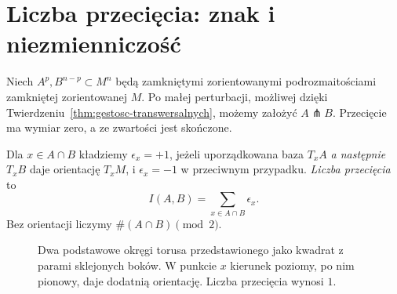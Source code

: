 \section{Liczba przecięcia: znak i niezmienniczość}
\label{sec:przeciecia-16}

Niech $A^p,B^{n-p}\subset M^n$ będą
zamkniętymi zorientowanymi
podrozmaitościami zamkniętej
zorientowanej $M$. Po małej
perturbacji, możliwej dzięki
Twierdzeniu~\ref{thm:gestosc-transwersalnych},
możemy założyć $A\pitchfork B$.
Przecięcie ma wymiar zero,
a ze zwartości jest skończone.

\begin{definicja}
\label{def:liczba-przeciecia-16}
Dla $x\in A\cap B$ kładziemy
$\epsilon_x=+1$, jeżeli
uporządkowana baza
$T_xA$ \emph{a następnie}
$T_xB$ daje orientację $T_xM$,
i $\epsilon_x=-1$ w przeciwnym
przypadku. \emph{Liczba
przecięcia} to
\[
 I(A,B)=\sum_{x\in A\cap B}\epsilon_x.
\]
Bez orientacji liczymy
$\#(A\cap B)\pmod 2$.
\end{definicja}

\begin{figure}[htbp]
\centering
{}
\caption{Dwa podstawowe okręgi torusa
przedstawionego jako kwadrat z parami
sklejonych boków. W punkcie $x$ kierunek
poziomy, po nim pionowy, daje dodatnią
orientację. Liczba przecięcia wynosi $1$.}
\label{fig:przeciecie-torus-16}
\end{figure}


